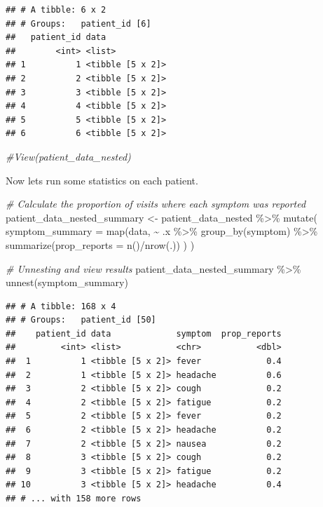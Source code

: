 \documentclass[
]{book}
\newenvironment{Shaded}{\begin{snugshade}}{\end{snugshade}}
\newcommand{\AttributeTok}[1]{\textcolor[rgb]{0.77,0.63,0.00}{#1}}
\newcommand{\CommentTok}[1]{\textcolor[rgb]{0.56,0.35,0.01}{\textit{#1}}}
\newcommand{\FunctionTok}[1]{\textcolor[rgb]{0.00,0.00,0.00}{#1}}
\newcommand{\NormalTok}[1]{#1}
\newcommand{\OtherTok}[1]{\textcolor[rgb]{0.56,0.35,0.01}{#1}}
\newcommand{\SpecialCharTok}[1]{\textcolor[rgb]{0.00,0.00,0.00}{#1}}
\begin{document}
\begin{verbatim}
## # A tibble: 6 x 2
## # Groups:   patient_id [6]
##   patient_id data            
##        <int> <list>          
## 1          1 <tibble [5 x 2]>
## 2          2 <tibble [5 x 2]>
## 3          3 <tibble [5 x 2]>
## 4          4 <tibble [5 x 2]>
## 5          5 <tibble [5 x 2]>
## 6          6 <tibble [5 x 2]>
\end{verbatim}

\begin{Shaded}
\begin{Highlighting}[]
\CommentTok{\#View(patient\_data\_nested)}
\end{Highlighting}
\end{Shaded}

Now lets run some statistics on each patient.

\begin{Shaded}
\begin{Highlighting}[]
\CommentTok{\# Calculate the proportion of visits where each symptom was reported}
\NormalTok{patient\_data\_nested\_summary }\OtherTok{\textless{}{-}}\NormalTok{ patient\_data\_nested }\SpecialCharTok{\%\textgreater{}\%} 
  \FunctionTok{mutate}\NormalTok{(}
    \AttributeTok{symptom\_summary =} \FunctionTok{map}\NormalTok{(data, }\SpecialCharTok{\textasciitilde{}}\NormalTok{ .x }\SpecialCharTok{\%\textgreater{}\%} 
      \FunctionTok{group\_by}\NormalTok{(symptom) }\SpecialCharTok{\%\textgreater{}\%} 
      \FunctionTok{summarize}\NormalTok{(}\AttributeTok{prop\_reports =} \FunctionTok{n}\NormalTok{()}\SpecialCharTok{/}\FunctionTok{nrow}\NormalTok{(.))}
\NormalTok{    )}
\NormalTok{  )}


\CommentTok{\# Unnesting and view results}
\NormalTok{patient\_data\_nested\_summary }\SpecialCharTok{\%\textgreater{}\%} 
  \FunctionTok{unnest}\NormalTok{(symptom\_summary)}
\end{Highlighting}
\end{Shaded}

\begin{verbatim}
## # A tibble: 168 x 4
## # Groups:   patient_id [50]
##    patient_id data             symptom  prop_reports
##         <int> <list>           <chr>           <dbl>
##  1          1 <tibble [5 x 2]> fever             0.4
##  2          1 <tibble [5 x 2]> headache          0.6
##  3          2 <tibble [5 x 2]> cough             0.2
##  4          2 <tibble [5 x 2]> fatigue           0.2
##  5          2 <tibble [5 x 2]> fever             0.2
##  6          2 <tibble [5 x 2]> headache          0.2
##  7          2 <tibble [5 x 2]> nausea            0.2
##  8          3 <tibble [5 x 2]> cough             0.2
##  9          3 <tibble [5 x 2]> fatigue           0.2
## 10          3 <tibble [5 x 2]> headache          0.4
## # ... with 158 more rows
\end{verbatim}
\end{document}
